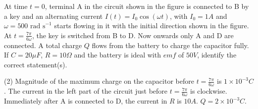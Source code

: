 
\item At time \( t = 0 \), terminal A in the circuit shown in the figure is connected to B by a key and an alternating current \( I(t) = I_0\cos(\omega t) \), with \( I_0 = 1 A \) and \( \omega = 500 \text{ rad s}^{-1} \) starts flowing in it with the initial direction shown in the figure. At \( t = \frac{7\pi}{6\omega} \), the key is switched from B to D. Now onwards only A and D are connected. A total charge \( Q \) flows from the battery to charge the capacitor fully. If \( C=20\mu F \), \( R=10 \Omega \) and the battery is ideal with \( emf \) of \( 50 V \), identify the correct statement(s).
    \begin{center}
    \end{center}
    \begin{tasks}(2)
        \task Magnitude of the maximum charge on the capacitor before \( t = \frac{7\pi}{6\omega} \) is \( 1 \times 10^{-3} C \).
        \task The current in the left part of the circuit just before \( t = \frac{7\pi}{6\omega} \) is clockwise.
        \task Immediately after A is connected to D, the current in \( R \) is \( 10 A \).
        \task \( Q = 2 \times 10^{-3} C \).
    \end{tasks}
